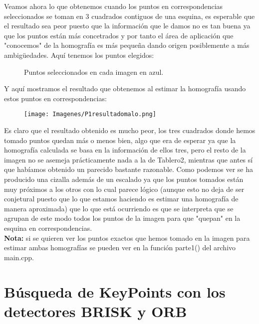 \documentclass[10pt,a4paper]{article}
\begin{document}
Veamos ahora lo que obtenemos cuando los puntos en correspondencias seleccionados se toman en 3 cuadrados contiguos de una esquina, es esperable que el resultado sea peor puesto que la información que le damos no es tan buena ya que los puntos están más concetrados y por tanto el área de aplicación que "conocemos" de la homografía es más pequeña dando origen posiblemente a más ambigüedades. Aquí tenemos los puntos elegidos:\\

\begin{figure}[H]
\centering
{}
\caption{Puntos seleccionados en cada imagen en azul.}
\end{figure}

Y aquí mostramos el resultado que obtenemos al estimar la homografía usando estos puntos en correspondencias:\\

\begin{figure}[H]
\centering
\texttt{[image: Imagenes/P1resultadomalo.png]}
\end{figure}

Es claro que el resultado obtenido es mucho peor, los tres cuadrados donde hemos tomado puntos quedan más o menos bien, algo que era de esperar ya que la homografía calculada se basa en la información de ellos tres, pero el resto de la imagen no se asemeja prácticamente nada a la de Tablero2, mientras que antes sí que habíamos obtenido un parecido bastante razonable. Como podemos ver se ha producido una cizalla además de un escalado ya que los puntos tomados están muy próximos a los otros con lo cual parece lógico (aunque esto no deja de ser conjetural puesto que lo que estamos haciendo es estimar una homografía de manera aproximada) que lo que está ocurriendo es que se interpreta que se agrupan de este modo todos los puntos de la imagen para que "quepan" en la esquina en correspondencias.\\

\textbf{Nota:} si se quieren ver los puntos exactos que hemos tomado en la imagen para estimar ambas homografías se pueden ver en la función parte1() del archivo main.cpp.

\newpage
\section{Búsqueda de KeyPoints con los detectores BRISK y ORB}
\end{document}
